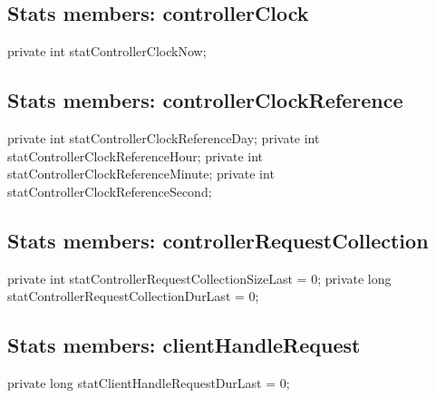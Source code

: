 \subsection{Stats members: controllerClock}
\nwenddocs{}\endmoddef{}
private int    statControllerClockNow;
\nwendcode{}\nwdocspar

\subsection{Stats members: controllerClockReference}
\nwenddocs{}\endmoddef{}
private int    statControllerClockReferenceDay;
private int    statControllerClockReferenceHour;
private int    statControllerClockReferenceMinute;
private int    statControllerClockReferenceSecond;
\nwendcode{}\nwdocspar

\subsection{Stats members: controllerRequestCollection}
\nwenddocs{}\endmoddef{}
private int    statControllerRequestCollectionSizeLast = 0;
private long   statControllerRequestCollectionDurLast = 0;
\nwendcode{}\nwdocspar

\subsection{Stats members: clientHandleRequest}
\nwenddocs{}\endmoddef{}
private long   statClientHandleRequestDurLast = 0;
\nwendcode{}\nwdocspar

